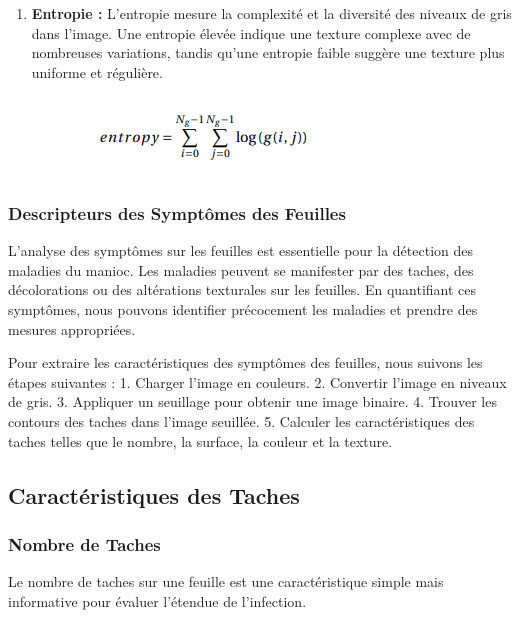 \begin{enumerate}
	\item \textbf{Entropie :}
	L'entropie mesure la complexité et la diversité des niveaux de gris dans l'image. Une entropie élevée indique une texture complexe avec de nombreuses variations, tandis qu'une entropie faible suggère une texture plus uniforme et régulière.
	
	\begin{figure}[H]
		\begin{center}
			\begin{minipage}[b]{0.5\textwidth}
				\centering
				\includegraphics[width=\textwidth]{images/entropy.png}
			\end{minipage}
		\end{center}
	\end{figure}
\end{enumerate}

\subsubsection{Descripteurs des Symptômes des Feuilles}

L'analyse des symptômes sur les feuilles est essentielle pour la détection des maladies du manioc. Les maladies peuvent se manifester par des taches, des décolorations ou des altérations texturales sur les feuilles. En quantifiant ces symptômes, nous pouvons identifier précocement les maladies et prendre des mesures appropriées.

Pour extraire les caractéristiques des symptômes des feuilles, nous suivons les étapes suivantes :
1. Charger l'image en couleurs.
2. Convertir l'image en niveaux de gris.
3. Appliquer un seuillage pour obtenir une image binaire.
4. Trouver les contours des taches dans l'image seuillée.
5. Calculer les caractéristiques des taches telles que le nombre, la surface, la couleur et la texture.

\subsection*{Caractéristiques des Taches}

\subsubsection*{Nombre de Taches}
Le nombre de taches sur une feuille est une caractéristique simple mais informative pour évaluer l'étendue de l'infection.

